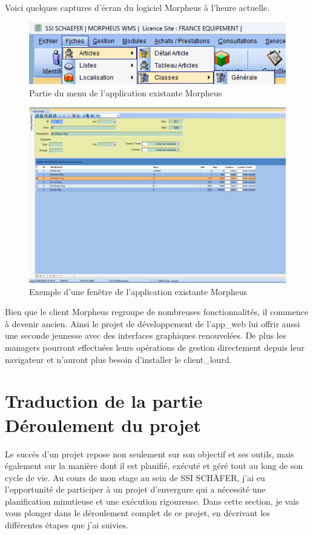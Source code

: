 \documentclass[a4paper, 12pt, french]{article}
\begin{document}
			\noindent Voici quelques captures d'écran du logiciel Morpheus à l'heure actuelle.

				\begin{figure}[ht!]
					\begin{center}
						\includegraphics[width=0.7\linewidth]{images/mph_menu.png}
					\end{center}
					\caption{Partie du menu de l'application existante Morpheus}
					\label{fig:mph_menu}
				\end{figure}

				\newpage

				\begin{figure}[ht!]
					\begin{center}
						\includegraphics[width=0.7\linewidth]{images/mph_window.png}
					\end{center}
					\caption{Exemple d'une fenêtre de l'application existante Morpheus}
					\label{fig:mph_window}
				\end{figure}

				Bien que le client Morpheus regroupe de nombreuses fonctionnalités, il commence à devenir ancien. Ainsi le projet de développement de l'\gls{app_web} lui offrir aussi une seconde jeunesse avec des interfaces graphiques renouvelées. De plus les managers pourront effectuées leurs opérations de gestion directement depuis leur navigateur et n'auront plus besoin d'installer le \gls{client_lourd}.

		\newpage
		\section{Traduction de la partie Déroulement du projet}\label{appendix:projet_translation}
			Le succès d'un projet repose non seulement sur son objectif et ses outils, mais également sur la manière dont il est planifié, exécuté et géré tout au long de son cycle de vie. Au cours de mon stage au sein de SSI SCHÄFER, j'ai eu l'opportunité de participer à un projet d'envergure qui a nécessité une planification minutieuse et une exécution rigoureuse. Dans cette section, je vais vous plonger dans le déroulement complet de ce projet, en décrivant les différentes étapes que j'ai suivies.
\end{document}
